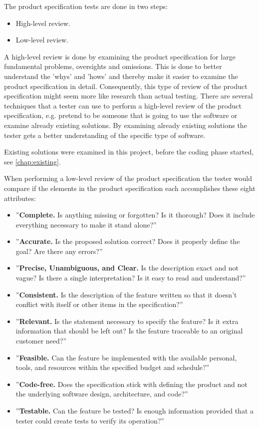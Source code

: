 \documentclass[../../master.tex]{subfiles}
\begin{document}
The product specification tests are done in two steps:
\begin{itemize}
	\item High-level review.
	\item Low-level review.
\end{itemize}

A high-level review is done by examining the product specification for large fundamental problems, oversights and omissions.
This is done to better understand the 'whys' and 'hows' and thereby make it easier to examine the product specification in detail.
Consequently, this type of review of the product specification might seem more like research than actual testing.
There are several techniques that a tester can use to perform a high-level review of the product specification, e.g. pretend to be someone that is going to use the software or examine already existing solutions.
By examining already existing solutions the tester gets a better understanding of the specific type of software. \cite{SoftwareTesting}

Existing solutions were examined in this project, before the coding phase started, see \cref{chap:existing}.

When performing a low-level review of the product specification the tester would compare if the elements in the product specification each accomplishes these eight attributes: \cite{SoftwareTesting}

\begin{itemize}
	\item ''\textbf{Complete.} Is anything missing or forgotten? Is it thorough? Does it include everything necessary to make it stand alone?''
	\item ''\textbf{Accurate.} Is the proposed solution correct? Does it properly define the goal? Are there any errors?''
	\item ''\textbf{Precise, Unambiguous, and Clear.} Is the description exact and not vague? Is there a single interpretation? Is it easy to read and understand?''
	\item ''\textbf{Consistent.} Is the description of the feature written so that it doesn't conflict with itself or other items in the specification?''
	\item ''\textbf{Relevant.} Is the statement necessary to specify the feature? Is it extra information that should be left out? Is the feature traceable to an original customer need?''
	\item ''\textbf{Feasible.} Can the feature be implemented with the available personal, tools, and resources within the specified budget and schedule?''
	\item ''\textbf{Code-free.} Does the specification stick with defining the product and not the underlying software design, architecture, and code?''
	\item ''\textbf{Testable.} Can the feature be tested? Is enough information provided that a tester could create tests to verify its operation?''
\end{itemize}
\end{document}
